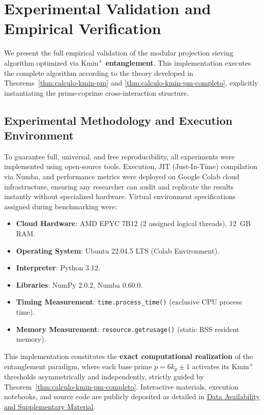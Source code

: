 \documentclass{article}
\numberwithin{equation}{section}
\theoremstyle{plain}
\theoremstyle{definition}
\begin{document}

\section{Experimental Validation and Empirical Verification}
\label{sec:validacion-experimental}

We present the full empirical validation of the modular projection sieving algorithm optimized via \textbf{$\mathrm{Kmin}^\pm$ entanglement}. This implementation executes the complete algorithm according to the theory developed in Theorems~\ref{thm:calculo-kmin-pm} and \ref{thm:calculo-kmin-pm-completo}, explicitly instantiating the prime-coprime cross-interaction structure.

\subsection{Experimental Methodology and Execution Environment}

To guarantee full, universal, and free reproducibility, all experiments were implemented using open-source tools. Execution, JIT (Just-In-Time) compilation via Numba, and performance metrics were deployed on Google Colab cloud infrastructure, ensuring any researcher can audit and replicate the results instantly without specialized hardware. Virtual environment specifications assigned during benchmarking were:

\begin{itemize}
    \item \textbf{Cloud Hardware}: AMD EPYC 7B12 (2 assigned logical threads), 12~GB RAM.
    \item \textbf{Operating System}: Ubuntu 22.04.5 LTS (Colab Environment).
    \item \textbf{Interpreter}: Python 3.12.
    \item \textbf{Libraries}: NumPy 2.0.2, Numba 0.60.0.
    \item \textbf{Timing Measurement}: \texttt{time.process\_time()} (exclusive CPU process time).
    \item \textbf{Memory Measurement}: \texttt{resource.getrusage()} (static RSS resident memory).
\end{itemize}

This implementation constitutes the \textbf{exact computational realization} of the entanglement paradigm, where each base prime $p = 6k_p \pm 1$ activates its $\mathrm{Kmin}^\pm$ thresholds asymmetrically and independently, strictly guided by Theorem~\ref{thm:calculo-kmin-pm-completo}. Interactive materials, execution notebooks, and source code are publicly deposited as detailed in \hyperref[sec:disponibilidad]{Data Availability and Supplementary Material}.
\end{document}
